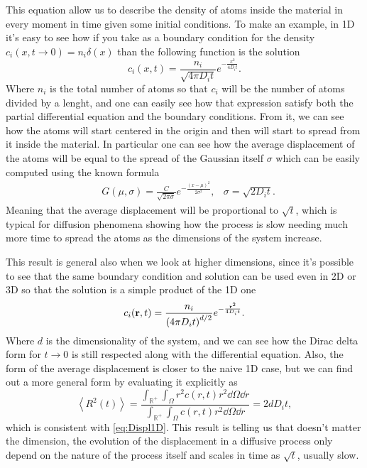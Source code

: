 \noindent
This equation allow us to describe the density of atoms inside the material in every moment in time given some initial conditions. To make an example, in 1D it's easy to see how if you take as a boundary condition for the density $c_i (x, t\to 0) = n_i\delta(x)$ than the following function is the solution
\begin{equation}
    c_i(x, t) = \frac{n_i}{\sqrt{4\pi D_it}}e^{-\frac{x^2}{4D_it}}.
\end{equation}
Where $n_i$ is the total number of atoms so that $c_i$ will be the number of atoms divided by a lenght, and one can easily see how that expression satisfy both the partial differential equation and the boundary conditions. From it, we can see how the atoms will start centered in the  origin and then will start to spread from it inside the material. In particular one can see how the average displacement of the atoms will be equal to the spread of the Gaussian itself $\sigma$ which can be easily computed using the known formula
\begin{align}
    \label{eq:Displ1D}
    &G(\mu, \sigma) = \frac{C}{\sqrt{2\pi\sigma}}e^{-\frac{(x - \mu)^2}{2\sigma^2}}, &\sigma = \sqrt{2D_it}.
\end{align}
Meaning that the average displacement will be proportional to $\sqrt{t}$, which is typical for diffusion phenomena showing how the process is slow needing much more time to spread the atoms as the dimensions of the system increase.

This result is general also when we look at higher dimensions, since it's possible to see that the same boundary condition and solution can be used even in 2D or 3D so that the solution is a simple product of the 1D one
\begin{equation}
    c_i(\vb{r}, t) = \frac{n_i}{\left( 4\pi D_it \right)^{d/2}}e^{-\frac{\vb{r}^2}{4D_it}}.
\end{equation}
Where $d$ is the dimensionality of the system, and we can see how the Dirac delta form for $t \to 0$ is still respected along with the differential equation. Also, the form of the average displacement is closer to the naive 1D case, but we can find out a more general form by evaluating it explicitly as
\begin{equation}
    \left\langle R^2(t) \right\rangle = \frac{\int_{\mathbb{R}^+}\int_{\Omega}r^2c(r, t) r^2\dd \Omega\dd r}{\int_{\mathbb{R}^+}\int_{\Omega}c(r, t) r^2\dd \Omega\dd r} = 2dD_it,
\end{equation}
which is consistent with \eqref{eq:Displ1D}. This result is telling us that doesn't matter the dimension, the evolution of the displacement in a diffusive process only depend on the nature of the process itself and scales in time as $\sqrt{t}$, usually slow.

